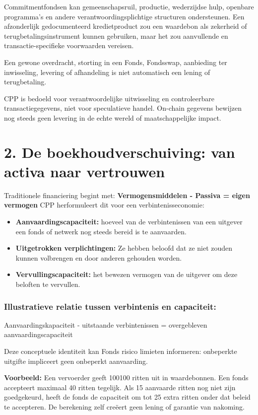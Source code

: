 \documentclass[11pt]{article}
\begin{document}
Commitmentfondsen kan gemeenschapsruil, productie, wederzijdse hulp, openbare programma's en andere verantwoordingsplichtige structuren ondersteunen. Een afzonderlijk gedocumenteerd kredietproduct zou een waardebon als zekerheid of terugbetalingsinstrument kunnen gebruiken, maar het zou aanvullende en transactie-specifieke voorwaarden vereisen.

Een gewone overdracht, storting in een Fonds, Fondsswap, aanbieding ter inwisseling, levering of afhandeling is niet automatisch een lening of terugbetaling.

CPP is bedoeld voor verantwoordelijke uitwisseling en controleerbare transactiegegevens, niet voor speculatieve handel. On-chain gegevens bewijzen nog steeds geen levering in de echte wereld of maatschappelijke impact.


\section*{2. De boekhoudverschuiving: van activa naar vertrouwen}

Traditionele financiering begint met: \textbf{Vermogensmiddelen - Passiva = eigen vermogen} CPP herformuleert dit voor een verbintenisseconomie:

\begin{itemize}[leftmargin=*]
\item \textbf{Aanvaardingscapaciteit:} hoeveel van de verbintenissen van een uitgever een fonds of netwerk nog steeds bereid is te aanvaarden.
\item \textbf{Uitgetrokken verplichtingen:} Ze hebben beloofd dat ze niet zouden kunnen volbrengen en door anderen gehouden worden.
\item \textbf{Vervullingscapaciteit:} het bewezen vermogen van de uitgever om deze beloften te vervullen.
\end{itemize}
\subsubsection*{Illustratieve relatie tussen verbintenis en capaciteit:}

Aanvaardingskapaciteit - uitstaande verbintenissen = overgebleven aanvaardingscapaciteit

Deze conceptuele identiteit kan Fonds risico limieten informeren: onbeperkte uitgifte impliceert geen onbeperkt aanvaarding.

\textbf{Voorbeeld:} Een vervoerder geeft 100100 ritten uit in waardebonnen. Een fonds accepteert maximaal 40 ritten tegelijk. Als 15 aanvaarde ritten nog niet zijn goedgekeurd, heeft de fonds de capaciteit om tot 25 extra ritten onder dat beleid te accepteren. De berekening zelf creëert geen lening of garantie van nakoming.
\end{document}
